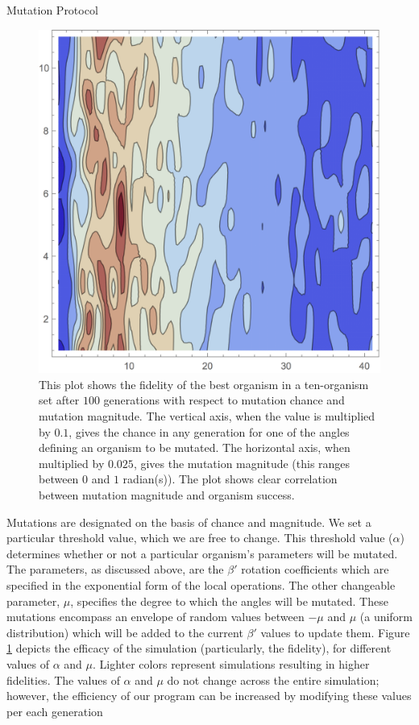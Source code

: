 \documentclass[14pt]{beamer}
\renewcommand{\maketitle}{%
	\begin{center}%
		\Huge\inserttitle\\[5mm]%
		\Large\insertauthor\\[5mm]%
		\Large\insertinstitute%
	\end{center}%
	\vspace*{-1.5ex}%
}
\begin{document}
\begin{frame}{\maketitle}
\begin{columns}
\begin{column}{.45\textwidth}
\begin{exampleblock}{Mutation Protocol}
		\begin{figure}[htpb]
		\centering
			\includegraphics[scale=1.3]{cp1.png}
		\centering
		\caption{This plot shows the fidelity of the best organism in a ten-organism set after $100$ generations with respect to mutation chance and mutation magnitude. The vertical axis, when the value is multiplied by $0.1$, gives the chance in any generation for one of the angles defining an organism to be mutated. The horizontal axis, when multiplied by $0.025$, gives the mutation magnitude (this ranges between $0$ and $1$ radian(s)). The plot shows clear correlation between mutation magnitude and organism success.}
		\label{fig:effplot}
	\end{figure}

	Mutations are designated on the basis of chance and magnitude. We set a particular threshold value, which we are free to change. This threshold value ($\alpha$) determines whether or not a particular organism's parameters will be mutated. The parameters, as discussed above, are the $\beta '$ rotation coefficients which are specified in the exponential form of the local operations. The other changeable parameter, $\mu$, specifies the degree to which the angles will be mutated. These mutations encompass an envelope of random values between $-\mu$ and $\mu$  (a uniform distribution) which will be added to the current $\beta'$ values to update them.  Figure \ref{fig:effplot} depicts the efficacy of the simulation (particularly, the fidelity), for different values of $\alpha$ and $\mu$.  Lighter colors represent simulations resulting in higher fidelities. The values of $\alpha$ and $\mu$ do not change across the entire simulation; however, the efficiency of our program can be increased by modifying these values per each generation


\end{exampleblock}
\end{column}
\end{columns}
\end{frame}
\end{document}
